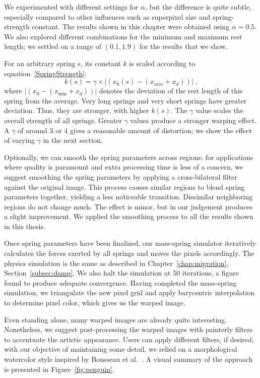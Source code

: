 We experimented with different settings for $\alpha$, but the difference is quite subtle, especially compared to other influences such as superpixel size and spring-strength constant.
The results shown in this chapter were obtained using $\alpha=0.5$. We also explored different combinations for the minimum and maximum rest length; we settled on a range of $(0.1,1.9)$ for the results that we show.

For an arbitrary spring s, its constant $k$ is scaled according to equation~\eqref{SpringStrength}:
 \begin{equation} \label{SpringStrength}
k(s) = \gamma \times | (x_0(s)-(x_{min}+x_{d})) |  \text{ ,}
\end{equation}
where $|(x_0-(x_{\min}+x_{d}))|$ denotes the deviation of the rest length of this spring from the average. Very long springs and very short springs have greater deviation. Thus, they are stronger, with higher $k(s)$. The $\gamma$ value scales the overall strength of all springs. Greater $\gamma$ values produce a stronger warping effect.
A $\gamma$ of around 3 or 4 gives a reasonable amount of distortion; we show the effect of varying $\gamma$
in the next section.


Optionally, we can smooth the spring parameters across regions: for applications where quality is paramount and extra processing time is less of a concern, we suggest smoothing the spring parameters by applying a cross-bilateral filter against the original image. This process causes similar regions to blend spring parameters together, yielding a less noticeable transition. Dissimilar neighboring regions do not change much. The effect is minor, but in our judgement produces a slight improvement. We applied the smoothing process to all the results shown in this thesis.

Once spring parameters have been finalized, our mass-spring simulator iteratively calculates the forces exerted by all springs and moves the pixels accordingly. The physics simulation is the same as described in Chapter~\ref{chap:migration}, Section~\ref{subsec:damp}. We also halt the simulation at 50 iterations, a figure found to produce adequate convergence. Having completed the mass-spring simulation, we triangulate the new pixel grid and apply barycentric interpolation to determine pixel color, which gives us the warped image. 

Even standing alone, many warped images are already quite interesting. Nonetheless, we suggest post-processing the warped images with painterly filters to accentuate the artistic appearance. Users can apply different filters, if desired; with our objective of maintaining some detail, we relied on a morphological watercolor style inspired
by Bousseau et al.~\cite{Bousseau:2007}. 
A visual summary of the approach is presented in Figure~\ref{fig:penguin}.

